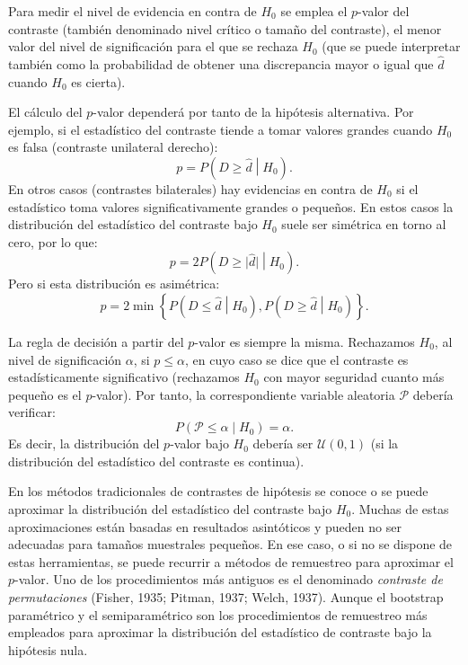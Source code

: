 \documentclass[
  spanish,
  10pt,
]{book}
\theoremstyle{break}
\theoremstyle{nonumberplain}
\begin{document}
Para medir el nivel de evidencia en contra de \(H_0\) se emplea el
\(p\)-valor del contraste (también denominado nivel crítico o
tamaño del contraste), el menor valor del nivel
de significación para el que se rechaza \(H_0\)
(que se puede interpretar también como la
probabilidad de obtener una discrepancia mayor o igual que
\(\hat{d}\) cuando \(H_0\) es cierta).

El cálculo del \(p\)-valor dependerá por tanto de la hipótesis alternativa.
Por ejemplo, si el estadístico del contraste tiende a tomar valores
grandes cuando \(H_0\) es falsa (contraste unilateral derecho):
\[p = P\left( D \geq \hat{d} \middle| H_0\right).\]
En otros casos (contrastes bilaterales) hay evidencias en contra de
\(H_0\) si el estadístico toma valores significativamente grandes o pequeños.
En estos casos la distribución del estadístico del contraste bajo \(H_0\)
suele ser simétrica en torno al cero, por lo que:
\[p = 2P\left( D \geq \vert \hat{d} \vert \middle| H_0 \right).\]
Pero si esta distribución es asimétrica:
\[p = 2 \min \left\{ P\left( D \leq \hat{d} \middle| H_0 \right),
P\left( D \geq \hat{d} \middle| H_0\right) \right\}.\]

La regla de decisión a partir del \(p\)-valor es siempre la misma.
Rechazamos \(H_0\), al nivel de significación \(\alpha\), si \(p \leq \alpha\),
en cuyo caso se dice que el contraste es estadísticamente significativo
(rechazamos \(H_0\) con mayor seguridad cuanto más pequeño es el \(p\)-valor).
Por tanto, la correspondiente variable aleatoria \(\mathcal{P}\) debería verificar:
\[P\left( \mathcal{P} \leq \alpha \middle| H_0\right)= \alpha.\]
Es decir, la distribución del \(p\)-valor bajo \(H_0\) debería ser \(\mathcal{U}(0,1)\)
(si la distribución del estadístico del contraste es continua).

En los métodos tradicionales de contrastes de hipótesis se conoce o se
puede aproximar la distribución del estadístico del contraste bajo \(H_0\).
Muchas de estas aproximaciones están basadas en resultados asintóticos
y pueden no ser adecuadas para tamaños muestrales pequeños.
En ese caso, o si no se dispone de estas herramientas,
se puede recurrir a métodos de remuestreo para aproximar el \(p\)-valor.
Uno de los procedimientos más antiguos es el denominado
\emph{contraste de permutaciones} (Fisher, 1935; Pitman, 1937; Welch, 1937).
Aunque el bootstrap paramétrico y el semiparamétrico son los
procedimientos de remuestreo más empleados para aproximar
la distribución del estadístico de contraste bajo la hipótesis nula.
\end{document}
